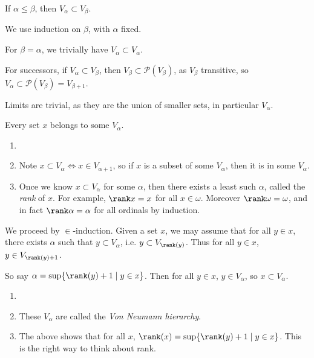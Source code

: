 \documentclass[12pt]{article}
\begin{document}
\begin{lemma}
	If $\alpha \leq \beta$, then $V_\alpha \subset V_{\beta}$.
\end{lemma}

\begin{proofbox}
	We use induction on $\beta$, with $\alpha$ fixed.

	For $\beta = \alpha$, we trivially have $V_{\alpha} \subset V_{\alpha}$.

	For successors, if $V_{\alpha} \subset V_{\beta}$, then $V_{\beta} \subset \mathcal{P}(V_{\beta})$, as $V_{\beta}$ transitive, so $V_{\alpha} \subset \mathcal{P}(V_{\beta}) = V_{\beta+1}$.

	Limits are trivial, as they are the union of smaller sets, in particular $V_{\alpha}$.
\end{proofbox}

\begin{lemma}
	Every set $x$ belongs to some $V_{\alpha}$.
\end{lemma}

\begin{remark}
	\begin{enumerate}
		\item[]
		\item Note $x \subset V_{\alpha} \iff x \in V_{\alpha+1}$, so if $x$ is a subset of some $V_{\alpha}$, then it is in some $V_{\alpha}$.
		\item Once we know $x \subset V_{\alpha}$ for some $\alpha$, then there exists a least such $\alpha$, called the \emph{rank} of $x$. For example, $\rank x = x$ for all $x \in \omega$. Moreover $\rank \omega = \omega$, and in fact $\rank \alpha = \alpha$ for all ordinals by induction.
	\end{enumerate}
\end{remark}

\begin{proofbox}
	We proceed by $\in$-induction. Given a set $x$, we may assume that for all $y \in x$, there exists $\alpha$ such that $y \subset V_{\alpha}$, i.e. $y \subset V_{\rank(y)}$. Thus for all $y \in x$, $y \in V_{\rank(y) + 1}$.

	So say $\alpha = \sup\{\rank(y) + 1 \mid y \in x\}$. Then for all $y \in x$, $y \in V_{\alpha}$, so $x \subset V_{\alpha}$.
\end{proofbox}

\begin{remark}
	\begin{enumerate}
		\item[]
		\item These $V_{\alpha}$ are called the \emph{Von Neumann hierarchy}.
		\item The above shows that for all $x$, $\rank(x) = \sup\{\rank(y) + 1 \mid y \in x\}$. This is the right way to think about rank.
	\end{enumerate}
\end{remark}
\end{document}
